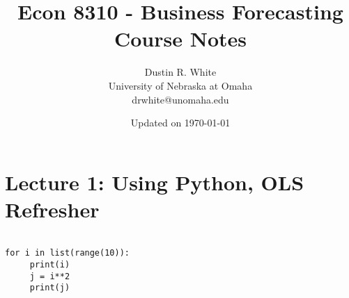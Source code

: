 \documentclass[12pt]{scrartcl}
\begin{document}
\title{Econ 8310 - Business Forecasting Course Notes}

\author[1]{Dustin R. White\\University of Nebraska at Omaha\\ drwhite@unomaha.edu}


\date{Updated on \today}
\maketitle
\thispagestyle{empty}


\section*{Lecture 1: Using Python, OLS Refresher}


\begin{verbatim}

for i in list(range(10)):
     print(i)
     j = i**2
     print(j)


\end{verbatim}
\end{document}
